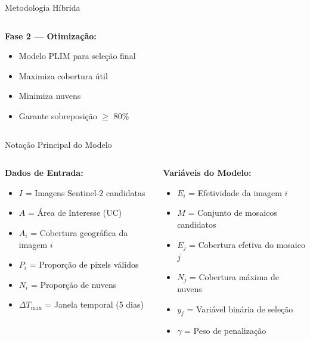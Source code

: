 \documentclass[aspectratio=169,11pt]{beamer}
\begin{document}
\begin{frame}{Metodologia Híbrida}
\begin{center}
\begin{columns}[c]
\begin{column}{0.7\textwidth}
        \vspace{0.3cm}
        \textbf{Fase 2 --- Otimização:}
        \begin{itemize}
            \item Modelo PLIM para seleção final
            \item Maximiza cobertura útil
            \item Minimiza nuvens
            \item Garante sobreposição $\geq$ 80\%
        \end{itemize}
    \end{column}
\end{columns}
\end{center}
\end{frame}

\begin{frame}{Notação Principal do Modelo}
\vspace{-0.2cm}
\begin{columns}[T]
    \begin{column}{0.48\textwidth}
        \textbf{\color{ufal}Dados de Entrada:}
        \begin{itemize}
            \item $I$ = Imagens Sentinel-2 candidatas
            \item $A$ = Área de Interesse (UC)
            \item $A_i$ = Cobertura geográfica da imagem $i$
            \item $P_i$ = Proporção de pixels válidos
            \item $N_i$ = Proporção de nuvens
            \item $\Delta T_{\max}$ = Janela temporal (5 dias)
        \end{itemize}
    \end{column}
    \begin{column}{0.48\textwidth}
        \textbf{\color{success}Variáveis do Modelo:}
        \begin{itemize}
            \item $E_i$ = Efetividade da imagem $i$
            \item $M$ = Conjunto de mosaicos candidatos
            \item $E_j$ = Cobertura efetiva do mosaico $j$
            \item $N_j$ = Cobertura máxima de nuvens
            \item $y_j$ = Variável binária de seleção
            \item $\gamma$ = Peso de penalização
        \end{itemize}
    \end{column}
\end{columns}
\end{frame}
\end{document}
